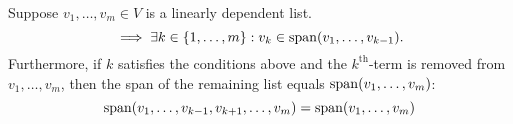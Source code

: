
\setcounter{thm}{18}
\begin{thm} 
  \label{thm: linear dependence lemma}
  Suppose $v_{1}, \dots, v_{m}\in V$ is a linearly dependent list.
  \begin{equation}
    \implies \exists k \in \{ 1, \dots, m \} : v_k \in \operatorname{span} (v_1, \dots, v_{k-1}).
  \end{equation}
  Furthermore, if $k$ satisfies the conditions above and the $k^{\text{th}}$-term is removed from $v_1, \dots, v_m$, then the span of the remaining list equals $\operatorname{span} (v_1, \dots, v_{m})$:
  \begin{equation}
    \operatorname{span} (v_1, \dots, v_{k-1}, v_{k+1}, \dots, v_m) = \operatorname{span} (v_1, \dots, v_m)
  \end{equation}
\end{thm}

